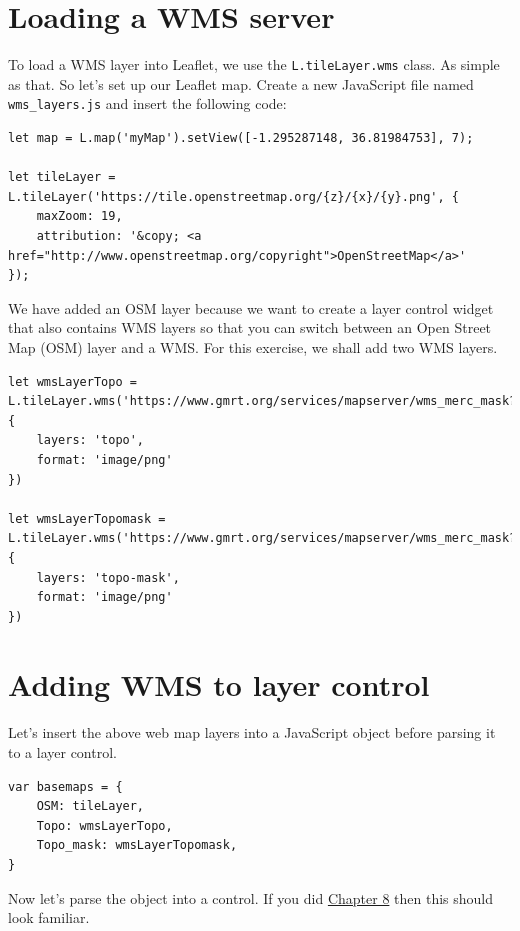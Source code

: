 \documentclass[
]{book}
\begin{document}
\hypertarget{loading-a-wms-server}{%
\section{Loading a WMS server}\label{loading-a-wms-server}}

To load a WMS layer into Leaflet, we use the \texttt{L.tileLayer.wms} class. As simple as that. So let's set up our Leaflet map. Create a new JavaScript file named \texttt{wms\_layers.js} and insert the following code:

\begin{verbatim}
let map = L.map('myMap').setView([-1.295287148, 36.81984753], 7);

let tileLayer = L.tileLayer('https://tile.openstreetmap.org/{z}/{x}/{y}.png', {
    maxZoom: 19,
    attribution: '&copy; <a href="http://www.openstreetmap.org/copyright">OpenStreetMap</a>'
});
\end{verbatim}

We have added an OSM layer because we want to create a layer control widget that also contains WMS layers so that you can switch between an Open Street Map (OSM) layer and a WMS. For this exercise, we shall add two WMS layers.

\begin{verbatim}
let wmsLayerTopo = L.tileLayer.wms('https://www.gmrt.org/services/mapserver/wms_merc_mask?', {
    layers: 'topo',
    format: 'image/png'
})

let wmsLayerTopomask = L.tileLayer.wms('https://www.gmrt.org/services/mapserver/wms_merc_mask?', {
    layers: 'topo-mask',
    format: 'image/png'
})
\end{verbatim}

\hypertarget{adding-wms-to-layer-control}{%
\section{Adding WMS to layer control}\label{adding-wms-to-layer-control}}

Let's insert the above web map layers into a JavaScript object before parsing it to a layer control.

\begin{verbatim}
var basemaps = {
    OSM: tileLayer,
    Topo: wmsLayerTopo,
    Topo_mask: wmsLayerTopomask,
}
\end{verbatim}

Now let's parse the object into a control. If you did \protect\hyperlink{layer-groups-and-controls}{Chapter 8} then this should look familiar.
\end{document}
